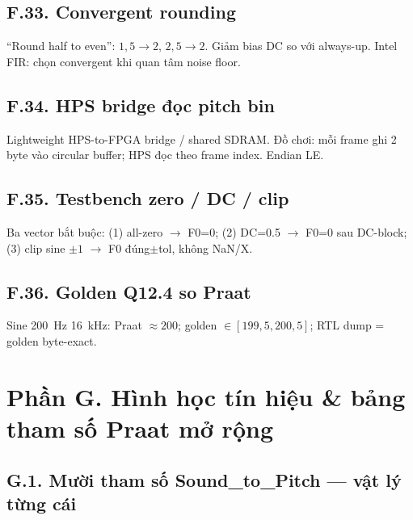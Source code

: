 \subsection*{F.33. Convergent rounding}
``Round half to even'': $1{,}5\to2$, $2{,}5\to2$. Giảm bias DC so với always-up. Intel FIR: chọn convergent khi quan tâm noise floor.

\subsection*{F.34. HPS bridge đọc pitch bin}
Lightweight HPS-to-FPGA bridge / shared SDRAM. Đồ chơi: mỗi frame ghi 2 byte vào circular buffer; HPS đọc theo frame index. Endian LE.

\subsection*{F.35. Testbench zero / DC / clip}
Ba vector bắt buộc: (1) all-zero $\to$ F0=0; (2) DC=0.5 $\to$ F0=0 sau DC-block; (3) clip sine $\pm1$ $\to$ F0 đúng$\pm$tol, không NaN/X.

\subsection*{F.36. Golden Q12.4 so Praat}
Sine 200~Hz 16~kHz: Praat $\approx200$; golden $\in[199{,}5,200{,}5]$; RTL dump = golden byte-exact.

\newpage
\section*{Phần G. Hình học tín hiệu \& bảng tham số Praat mở rộng}

\subsection*{G.1. Mười tham số Sound\_to\_Pitch --- vật lý từng cái}

